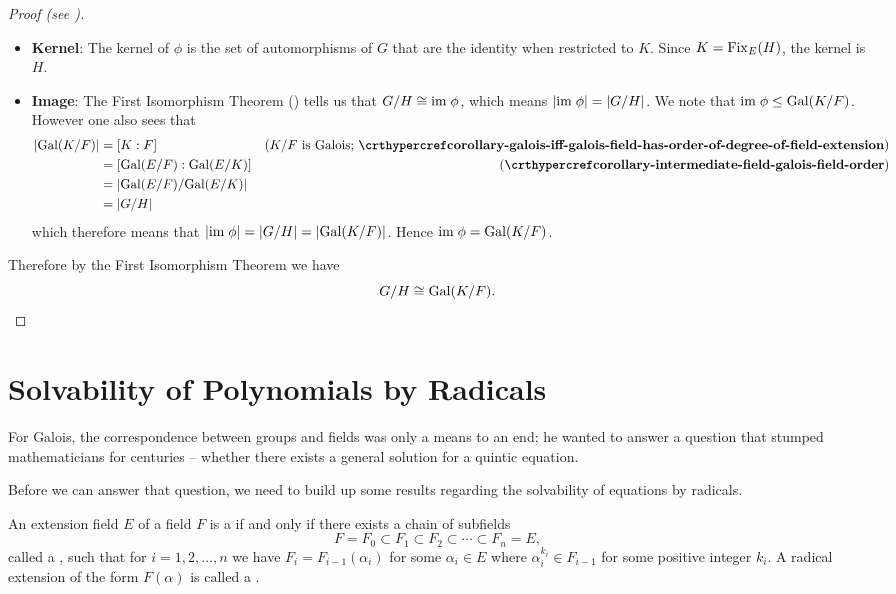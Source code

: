 \begin{proof}[Proof (see {\cite[Theorem 23.23, Statment 4]{judson_beezer_2022}})]
\begin{itemize}
        \item \textbf{Kernel}: The kernel of $\phi$ is the set of automorphisms of $G$ that are the identity when restricted to $K$. Since $K = \mathrm{Fix}_{E}(H)$, the kernel is $H$.

        \item \textbf{Image}: The First Isomorphism Theorem () tells us that $G/H \cong \mathrm{im}\;\phi$, which means $|\mathrm{im}\;\phi| = |G/H|$. We note that $\mathrm{im}\;\phi \leq \mathrm{Gal}(K/F)$. However one also sees that
        \begin{align*}
            |\Gal{K/F}| &= [K:F] & (K/F \text{ is Galois; } \myref{corollary-galois-iff-galois-field-has-order-of-degree-of-field-extension})\\
            &= [\Gal{E/F}:\Gal{E/K}] & (\myref{corollary-intermediate-field-galois-field-order})\\
            &= |\Gal{E/F}/\Gal{E/K}|\\
            &= |G/H|
        \end{align*}
        which therefore means that $|\mathrm{im}\;\phi| = |G/H| = |\mathrm{Gal}(K/F)|$. Hence $\mathrm{im}\;\phi = \mathrm{Gal}(K/F)$.
    \end{itemize}
    Therefore by the First Isomorphism Theorem we have
    \[
        G/H \cong \mathrm{Gal}(K/F).\qedhere
    \]
\end{proof}

\section{Solvability of Polynomials by Radicals}
For Galois, the correspondence between groups and fields was only a means to an end; he wanted to answer a question that stumped mathematicians for centuries -- whether there exists a general solution for a quintic equation.

Before we can answer that question, we need to build up some results regarding the solvability of equations by radicals.

\begin{definition}
    An extension field $E$ of a field $F$ is a  if and only if there exists a chain of subfields
    \[
        F = F_0 \subset F_1 \subset F_2 \subset \cdots \subset F_n = E,
    \]
    called a , such that for $i = 1, 2, \dots, n$ we have $F_i = F_{i-1}(\alpha_i)$ for some $\alpha_i \in E$ where $\alpha_i^{k_i} \in F_{i-1}$ for some positive integer $k_i$. A radical extension of the form $F(\alpha)$ is called a .
\end{definition}


